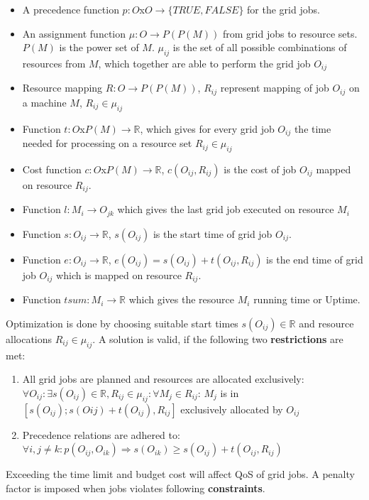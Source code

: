 \begin{itemize}
  \item A precedence function 
  \subitem $p:O$x$O \rightarrow \{ TRUE,FALSE\}$ for the grid jobs.
  \item An assignment function $\mu:O \rightarrow P(P(M))$ from grid jobs to resource sets. $P(M)$ is the power set of $M$. $\mu_{ij}$ is the set  of all possible combinations of resources from $M$, which together are able to perform the grid job $O_{ij}$
  \item Resource mapping $R: O \rightarrow P(P(M)) $, $R_{ij}$ represent mapping of job $O_{ij}$ on a machine $M$, $R_{ij} \in \mu_{ij}$
  \item Function $t:O$x$P(M) \rightarrow \mathbb{R}$, which gives for every grid job $O_{ij}$ the time needed for processing on a resource set $R_{ij} \in \mu_{ij}$
  \item Cost function $c: O$x$P(M) \rightarrow \mathbb{R}$, $c(O_{ij},R_{ij})$ is the cost of job $O_{ij}$ mapped on resource $R_{ij}$.
  \item Function $l:M_i  \rightarrow O_{jk}$ which gives the last grid job executed on resource $M_i$
  \item Function $s:O_{ij} \rightarrow \mathbb{R}$, $s(O_{ij})$ is the start time of grid job $O_{ij}$.
  \item Function $e:O_{ij} \rightarrow \mathbb{R}$, $e(O_{ij}) = s(O_{ij}) + t(O_{ij},R_{ij})$ is the end time of grid job $O_{ij}$ which is mapped on resource $R_{ij}$.
  \item Function $tsum : M_i \rightarrow \mathbb{R}$ which gives the resource $M_i$ running time or Uptime.
\end{itemize}
Optimization is done by choosing suitable start times $s(O_{ij}) \in \mathbb{R}$ and resource allocations $R_{ij} \in \mu_{ij}$. A solution is valid, if the following two \textbf{restrictions} are met:
\begin{enumerate}
  \item All grid jobs are planned and resources are allocated exclusively:
  \subitem $ \forall O_{ij} : \exists s(O_{ij}) \in \mathbb{R}, R_{ij} \in \mu_{ij} : \forall M_j \in R_{ij} $:
  \subitem $M_j$ is in $[s(O_{ij});s(O{ij})+t(O_{ij}),R_{ij}]$ exclusively allocated by $O_{ij}$
  \item Precedence relations are adhered to: 
  \subitem $\forall i, j \neq k : p(O_{ij},O_{ik}) \Rightarrow s(O_{ik}) \geq s(O_{ij}) +t(O_{ij}, R_{ij})$
\end{enumerate}
Exceeding the time limit and budget cost will affect QoS of grid jobs. A penalty factor is imposed when jobs violates following \textbf{constraints}.
